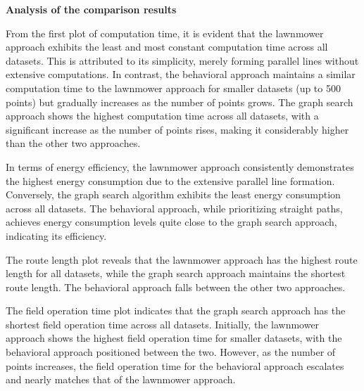 


\textbf{Analysis of the comparison results}  


\vspace*{6mm}


From the first plot of computation time, it is evident that the lawnmower approach exhibits the least and most constant computation time across all datasets. This is attributed to its simplicity, merely forming parallel lines without extensive computations. In contrast, the behavioral approach maintains a similar computation time to the lawnmower approach for smaller datasets (up to 500 points) but gradually increases as the number of points grows. The graph search approach shows the highest computation time across all datasets, with a significant increase as the number of points rises, making it considerably higher than the other two approaches.


\vspace*{6mm}


In terms of energy efficiency, the lawnmower approach consistently demonstrates the highest energy consumption due to the extensive parallel line formation. Conversely, the graph search algorithm exhibits the least energy consumption across all datasets. The behavioral approach, while prioritizing straight paths, achieves energy consumption levels quite close to the graph search approach, indicating its efficiency.


\vspace*{6mm}


The route length plot reveals that the lawnmower approach has the highest route length for all datasets, while the graph search approach maintains the shortest route length. The behavioral approach falls between the other two approaches.


\vspace*{6mm}


The field operation time plot indicates that the graph search approach has the shortest field operation time across all datasets. Initially, the lawnmower approach shows the highest field operation time for smaller datasets, with the behavioral approach positioned between the two. However, as the number of points increases, the field operation time for the behavioral approach escalates and nearly matches that of the lawnmower approach. 



